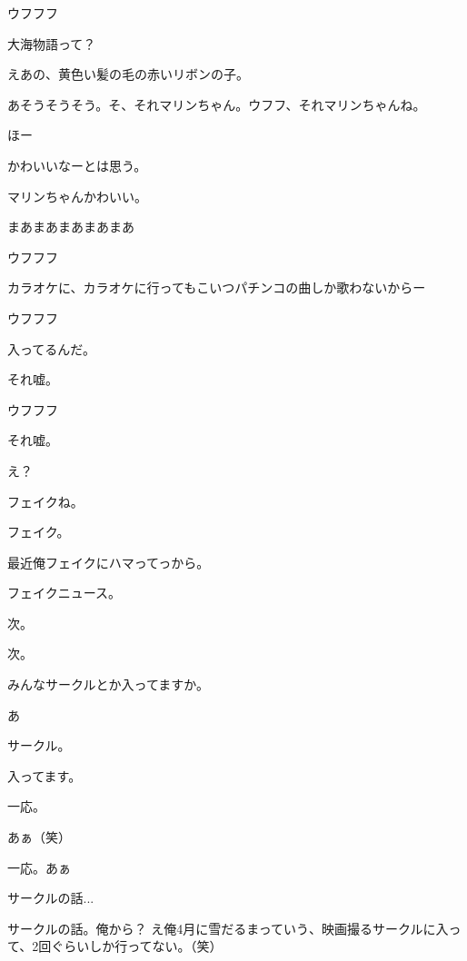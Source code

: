 \begin{multicols}{3}
{        ウフフフ

        大海物語って？

        えあの、黄色い髪の毛の赤いリボンの子。

        あそうそうそう。そ、それマリンちゃん。ウフフ、それマリンちゃんね。

        ほー

        かわいいなーとは思う。

        マリンちゃんかわいい。

        まあまあまあまあまあ

        ウフフフ

        カラオケに、カラオケに行ってもこいつパチンコの曲しか歌わないからー

        ウフフフ

        入ってるんだ。

        それ嘘。

        ウフフフ

        それ嘘。

        え？

        フェイクね。

        フェイク。

        最近俺フェイクにハマってっから。

        フェイクニュース。

        次。

        次。

        みんなサークルとか入ってますか。

        あ

        サークル。

        入ってます。

        一応。

        あぁ（笑）

        一応。あぁ

        サークルの話...

        サークルの話。俺から？ え俺4月に雪だるまっていう、映画撮るサークルに入って、2回ぐらいしか行ってない。（笑）

}
\end{multicols}
